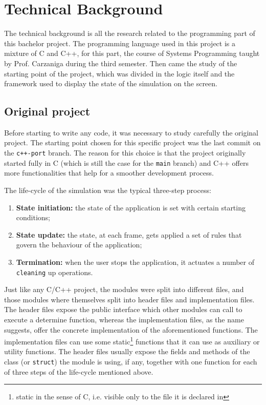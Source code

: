 \section{Technical Background}

The technical background is all the research related to the programming part of
this bachelor project. The programming language used in this project is a
mixture of C and C++, for this part, the course of Systems Programming taught by
Prof. Carzaniga during the third semester. Then came the study of the starting
point of the project, which was divided in the logic itself and the framework
used to display the state of the simulation on the screen.

\subsection{Original project}

Before starting to write any code, it was necessary to study carefully the
original project. The starting point chosen for this specific project was the
last commit on the \texttt{c++-port} branch. The reason for this choice is that
the project originally started fully in C (which is still the case for the
\texttt{main} branch) and C++ offers more functionalities that help for a
smoother development process.

The life-cycle of the simulation was the typical three-step process:
\begin{enumerate}
	\item \textbf{State initiation:} the state of the application is set with certain
	      starting conditions;
	\item \textbf{State update:} the state, at each frame, gets applied a set of rules that
	      govern the behaviour of the application;
	\item \textbf{Termination:} when the user stops the application, it actuates a number
	      of \texttt{cleaning} up operations.
\end{enumerate}

Just like any C/C++ project, the modules were split into different files, and
those modules where themselves split into header files and implementation files.
The header files expose the public interface which other modules can call to
execute a determine function, whereas the implementation files, as the name
suggests, offer the concrete implementation of the aforementioned functions. The
implementation files can use some static\footnote{static in the sense of C,
	i.e. visible only to the file it is declared in} functions that it can use
as auxiliary or utility functions. The header files usually expose the fields
and methods of the class (or \texttt{struct}) the module is using, if any, together
with one function for each of three steps of the life-cycle mentioned above.


